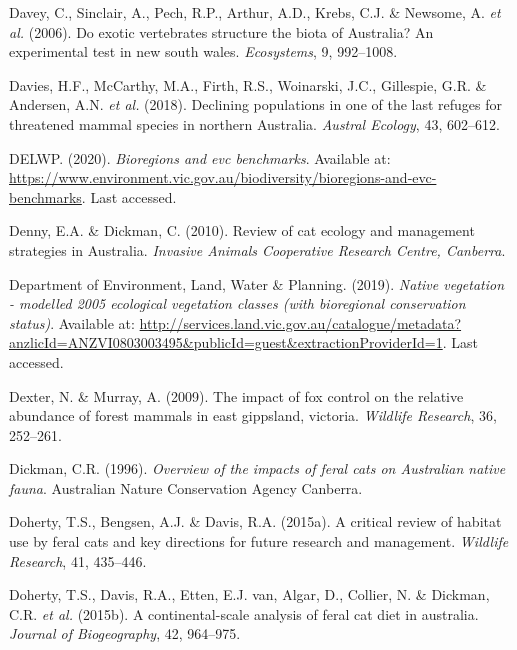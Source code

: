 \documentclass[11pt,a4paper,titlepage,twoside,openright]{style/unimelbthesis}
\begin{document}
\begin{mainmatter}
\leavevmode\hypertarget{ref-davey2006exotic}{}%
Davey, C., Sinclair, A., Pech, R.P., Arthur, A.D., Krebs, C.J. \& Newsome, A. \emph{et al.} (2006). Do exotic vertebrates structure the biota of Australia? An experimental test in new south wales. \emph{Ecosystems}, 9, 992--1008.

\leavevmode\hypertarget{ref-davies2018declining}{}%
Davies, H.F., McCarthy, M.A., Firth, R.S., Woinarski, J.C., Gillespie, G.R. \& Andersen, A.N. \emph{et al.} (2018). Declining populations in one of the last refuges for threatened mammal species in northern Australia. \emph{Austral Ecology}, 43, 602--612.

\leavevmode\hypertarget{ref-delwp2020bioregions}{}%
DELWP. (2020). \emph{Bioregions and evc benchmarks}. Available at: \url{https://www.environment.vic.gov.au/biodiversity/bioregions-and-evc-benchmarks}. Last accessed.

\leavevmode\hypertarget{ref-denny2010review}{}%
Denny, E.A. \& Dickman, C. (2010). Review of cat ecology and management strategies in Australia. \emph{Invasive Animals Cooperative Research Centre, Canberra}.

\leavevmode\hypertarget{ref-NV2005_EVCBCS}{}%
Department of Environment, Land, Water \& Planning. (2019). \emph{Native vegetation - modelled 2005 ecological vegetation classes (with bioregional conservation status)}. Available at: \url{http://services.land.vic.gov.au/catalogue/metadata?anzlicId=ANZVI0803003495\&publicId=guest\&extractionProviderId=1}. Last accessed.

\leavevmode\hypertarget{ref-dexter2009impact}{}%
Dexter, N. \& Murray, A. (2009). The impact of fox control on the relative abundance of forest mammals in east gippsland, victoria. \emph{Wildlife Research}, 36, 252--261.

\leavevmode\hypertarget{ref-dickman1996overview}{}%
Dickman, C.R. (1996). \emph{Overview of the impacts of feral cats on Australian native fauna}. Australian Nature Conservation Agency Canberra.

\leavevmode\hypertarget{ref-doherty2015critical}{}%
Doherty, T.S., Bengsen, A.J. \& Davis, R.A. (2015a). A critical review of habitat use by feral cats and key directions for future research and management. \emph{Wildlife Research}, 41, 435--446.

\leavevmode\hypertarget{ref-doherty2015continental}{}%
Doherty, T.S., Davis, R.A., Etten, E.J. van, Algar, D., Collier, N. \& Dickman, C.R. \emph{et al.} (2015b). A continental-scale analysis of feral cat diet in australia. \emph{Journal of Biogeography}, 42, 964--975.


\end{mainmatter}
\end{document}
